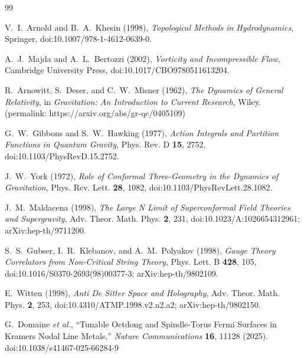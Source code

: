 \documentclass[11pt]{article}
\begin{document}
    \begin{thebibliography}{99}

        V.~I.~Arnold and B.~A.~Khesin (1998),
        \textit{Topological Methods in Hydrodynamics},
        Springer,
        doi:10.1007/978-1-4612-0639-0.

        A.~J.~Majda and A.~L.~Bertozzi (2002),
        \textit{Vorticity and Incompressible Flow},
        Cambridge University Press,
        doi:10.1017/CBO9780511613204.

        R.~Arnowitt, S.~Deser, and C.~W.~Misner (1962),
        \textit{The Dynamics of General Relativity},
        in \textit{Gravitation: An Introduction to Current Research}, Wiley.
        (permalink: https://arxiv.org/abs/gr-qc/0405109)

        G.~W.~Gibbons and S.~W.~Hawking (1977),
        \textit{Action Integrals and Partition Functions in Quantum Gravity},
        Phys. Rev. D \textbf{15}, 2752,
        doi:10.1103/PhysRevD.15.2752.

        J.~W.~York (1972),
        \textit{Role of Conformal Three-Geometry in the Dynamics of Gravitation},
        Phys. Rev. Lett. \textbf{28}, 1082,
        doi:10.1103/PhysRevLett.28.1082.

        J.~M.~Maldacena (1998),
        \textit{The Large N Limit of Superconformal Field Theories and Supergravity},
        Adv. Theor. Math. Phys. \textbf{2}, 231,
        doi:10.1023/A:1026654312961; arXiv:hep-th/9711200.

        S.~S.~Gubser, I.~R.~Klebanov, and A.~M.~Polyakov (1998),
        \textit{Gauge Theory Correlators from Non-Critical String Theory},
        Phys. Lett. B \textbf{428}, 105,
        doi:10.1016/S0370-2693(98)00377-3; arXiv:hep-th/9802109.

        E.~Witten (1998),
        \textit{Anti De Sitter Space and Holography},
        Adv. Theor. Math. Phys. \textbf{2}, 253,
        doi:10.4310/ATMP.1998.v2.n2.a2; arXiv:hep-th/9802150.

        G.~Domaine \emph{et al.},
        ``Tunable Octdong and Spindle-Torus Fermi Surfaces in Kramers Nodal Line Metals,''
        \emph{Nature Communications} \textbf{16}, 11128 (2025).
        doi:10.1038/s41467-025-66284-9


\end{thebibliography}
\end{document}
